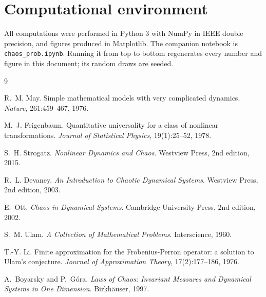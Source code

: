 \documentclass[11pt,a4paper]{article}
\theoremstyle{definition}
\theoremstyle{remark}
\begin{document}
\section{Computational environment}

All computations were performed in Python 3 with NumPy in IEEE double
precision, and figures produced in Matplotlib. The companion notebook is
\texttt{chaos\_prob.ipynb}. Running it from top to bottom regenerates every
number and figure in this document; its random draws are seeded.

\begin{thebibliography}{9}

R.~M. May.
\newblock Simple mathematical models with very complicated dynamics.
\newblock \emph{Nature}, 261:459--467, 1976.

M.~J. Feigenbaum.
\newblock Quantitative universality for a class of nonlinear transformations.
\newblock \emph{Journal of Statistical Physics}, 19(1):25--52, 1978.

S.~H. Strogatz.
\newblock \emph{Nonlinear Dynamics and Chaos}.
\newblock Westview Press, 2nd edition, 2015.

R.~L. Devaney.
\newblock \emph{An Introduction to Chaotic Dynamical Systems}.
\newblock Westview Press, 2nd edition, 2003.

E.~Ott.
\newblock \emph{Chaos in Dynamical Systems}.
\newblock Cambridge University Press, 2nd edition, 2002.

S.~M. Ulam.
\newblock \emph{A Collection of Mathematical Problems}.
\newblock Interscience, 1960.

T.-Y. Li.
\newblock Finite approximation for the Frobenius-Perron operator: a solution to
  Ulam's conjecture.
\newblock \emph{Journal of Approximation Theory}, 17(2):177--186, 1976.

A.~Boyarsky and P.~G\'{o}ra.
\newblock \emph{Laws of Chaos: Invariant Measures and Dynamical Systems in One
  Dimension}.
\newblock Birkh\"{a}user, 1997.

\end{thebibliography}
\end{document}
